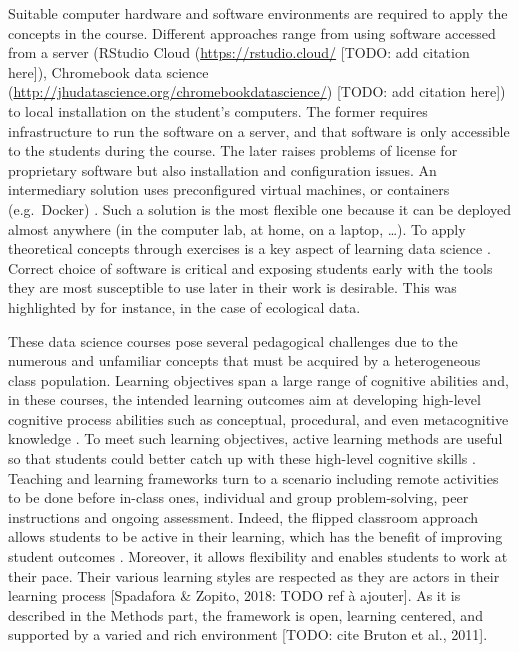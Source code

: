 \documentclass{aims}
\theoremstyle{definition}
\begin{document}
Suitable computer hardware and software environments are required to
apply the concepts in the course. Different approaches range from using
software accessed from a server (RStudio Cloud
(\url{https://rstudio.cloud/} {[}TODO: add citation here{]}), Chromebook
data science (\url{http://jhudatascience.org/chromebookdatascience/})
{[}TODO: add citation here{]}) to local installation on the student's
computers. The former requires infrastructure to run the software on a
server, and that software is only accessible to the students during the
course. The later raises problems of license for proprietary software
but also installation and configuration issues. An intermediary solution
uses preconfigured virtual machines, or containers (e.g.~Docker)
\cite{Cetinkaya-Rundel2018, Boettiger2015}. Such a solution is the most
flexible one because it can be deployed almost anywhere (in the computer
lab, at home, on a laptop, \ldots). To apply theoretical concepts
through exercises is a key aspect of learning data science
\cite{Larwin2011}. Correct choice of software is critical and exposing
students early with the tools they are most susceptible to use later in
their work is desirable. This was highlighted by \cite{Auker2020} for
instance, in the case of ecological data.

These data science courses pose several pedagogical challenges due to
the numerous and unfamiliar concepts that must be acquired by a
heterogeneous class population. Learning objectives span a large range
of cognitive abilities and, in these courses, the intended learning
outcomes aim at developing high-level cognitive process abilities such
as conceptual, procedural, and even metacognitive knowledge
\cite{Krathwohl2002}. To meet such learning objectives, active learning
methods are useful so that students could better catch up with these
high-level cognitive skills \cite{Freeman2014}. Teaching and learning
frameworks turn to a scenario including remote activities to be done
before in-class ones, individual and group problem-solving, peer
instructions and ongoing assessment. Indeed, the flipped classroom
approach allows students to be active in their learning, which has the
benefit of improving student outcomes \cite{Freeman2014}. Moreover, it
allows flexibility and enables students to work at their pace. Their
various learning styles are respected as they are actors in their
learning process {[}Spadafora \& Zopito, 2018: TODO ref à ajouter{]}. As
it is described in the Methods part, the framework is open, learning
centered, and supported by a varied and rich environment {[}TODO: cite
Bruton et al., 2011{]}.
\end{document}
